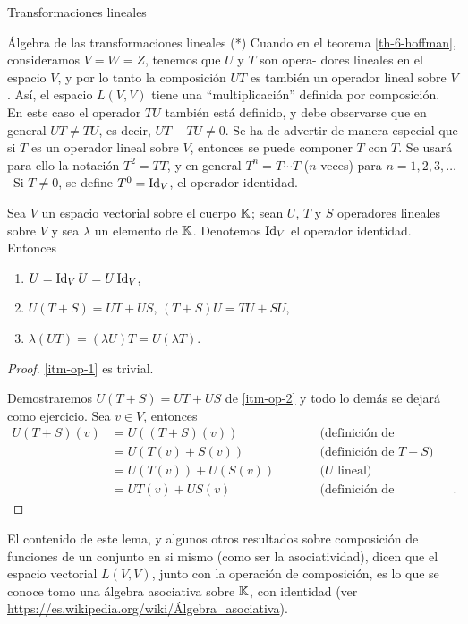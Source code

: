 \begin{chapter}{Transformaciones lineales}
\begin{section}{\'Algebra de las transformaciones lineales (*)}
        Cuando  en el teorema \ref{th-6-hoffman}, consideramos $V = W = Z$, tenemos que $U$ y $T$ son opera-
        dores lineales en el espacio $V$, y por lo tanto la composición $UT$ es también un operador lineal sobre $V$. Así, el espacio $L(V, V)$ tiene una ``multiplicación'' definida por composición. En este caso el operador $TU$ también está definido, y debe observarse que en general $UT \not= TU$, es decir, $UT - TU \not= 0$. Se ha de advertir de manera especial que si $T$ es un operador lineal sobre $V$, entonces se puede componer $T$ con $T$. Se usará para ello la notación $T^2 = TT$, y en general $T^n = T \cdots T$ ($n$ veces) para $n = 1, 2, 3, \ldots$\,  Si $T \ne 0$, se define $T^0 = \operatorname{Id}_V$, el operador identidad.
            
        \begin{lema}
            Sea $V$ un espacio vectorial sobre el cuerpo $\mathbb K$; sean $U$, $T$ y $S$ operadores lineales sobre $V$ y sea $\lambda$ un elemento de $\mathbb K$. Denotemos $\operatorname{Id}_V$ el operador identidad. Entonces
            \begin{enumerate}
                \item\label{itm-op-1} $U = \operatorname{Id}_VU = U\operatorname{Id}_V$,
                \item\label{itm-op-2} $U(T+S) = UT + US$, $(T+S)U = TU + SU$,
                \item\label{itm-op-3} $\lambda (UT) = (\lambda U)T = U (\lambda T)$.
            \end{enumerate}
        \end{lema}
        \begin{proof}
            \ref{itm-op-1} es trivial. 
            
            Demostraremos $U(T+S) = UT + US$ de \ref{itm-op-2} y todo lo demás se dejará como ejercicio.
            Sea $ v \in V$, entonces
            \begin{align*}
            U(T+S)(v) &= U((T+S)(v))&\qquad&\text{(definición de composición)} \\
            &= U(T(v)+S(v))&\qquad&\text{(definición  de $T+S$)} \\
            &= U(T(v))+U(S(v))&\qquad&\text{($U$ lineal)} \\
            &= UT(v)+US(v)&\qquad&\text{(definición de composición)}.
            \end{align*}  
        \end{proof}	
    
    El contenido de este lema, y algunos otros resultados  sobre composición de funciones de un conjunto en si mismo (como ser la asociatividad), dicen que el espacio vectorial $L(V, V)$, junto con la operación de composición, es lo que se conoce tomo una  álgebra asociativa sobre $\mathbb K$,  con identidad (ver \href{https://es.wikipedia.org/wiki/Álgebra\_asociativa}{https://es.wikipedia.org/wiki/Álgebra\_asociativa}). 
    

\end{section}
\end{chapter}

